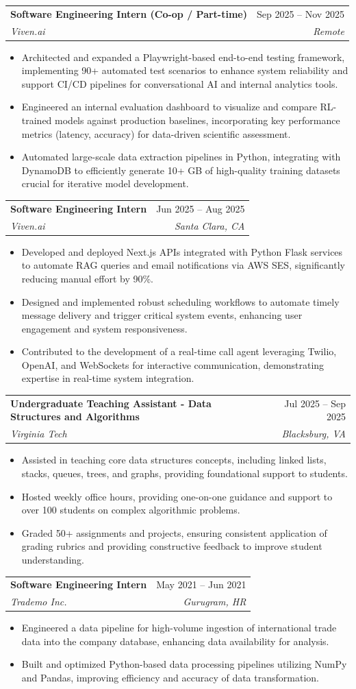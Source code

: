 \documentclass[letterpaper,11pt]{article}
\makeatletter
\newcommand{\resumeItem}[1]{
  \item\small{
    {#1 \vspace{-2pt}}
  }
}
\newcommand{\resumeSubheading}[4]{
  \vspace{-2pt}\item
    \begin{tabular*}{0.97\textwidth}[t]{l@{\extracolsep{\fill}}r}
      \textbf{#1} & #2 \\
      \textit{\small#3} & \textit{\small #4} \\
    \end{tabular*}\vspace{-7pt}
}
\newcommand{\resumeItemListStart}{\begin{itemize}}
\newcommand{\resumeItemListEnd}{\end{itemize}\vspace{-5pt}}
\makeatother
\begin{document}
    \resumeSubheading
      {Software Engineering Intern (Co-op / Part-time)}{Sep 2025 -- Nov 2025}
      {Viven.ai}{Remote}
      \resumeItemListStart
        \resumeItem{Architected and expanded a Playwright-based end-to-end testing framework, implementing 90+ automated test scenarios to enhance system reliability and support CI/CD pipelines for conversational AI and internal analytics tools.}
        \resumeItem{Engineered an internal evaluation dashboard to visualize and compare RL-trained models against production baselines, incorporating key performance metrics (latency, accuracy) for data-driven scientific assessment.}
        \resumeItem{Automated large-scale data extraction pipelines in Python, integrating with DynamoDB to efficiently generate 10+ GB of high-quality training datasets crucial for iterative model development.}
      \resumeItemListEnd

       \resumeSubheading
      {Software Engineering Intern}{Jun 2025 -- Aug 2025}
      {Viven.ai}{Santa Clara, CA}
      \resumeItemListStart
        \resumeItem{Developed and deployed Next.js APIs integrated with Python Flask services to automate RAG queries and email notifications via AWS SES, significantly reducing manual effort by 90\%.}
        \resumeItem{Designed and implemented robust scheduling workflows to automate timely message delivery and trigger critical system events, enhancing user engagement and system responsiveness.}
        \resumeItem{Contributed to the development of a real-time call agent leveraging Twilio, OpenAI, and WebSockets for interactive communication, demonstrating expertise in real-time system integration.}
      \resumeItemListEnd

    

    \resumeSubheading
      {Undergraduate Teaching Assistant - Data Structures and Algorithms}{Jul 2025 -- Sep 2025}
      {Virginia Tech}{Blacksburg, VA}
      \resumeItemListStart
        \resumeItem{Assisted in teaching core data structures concepts, including linked lists, stacks, queues, trees, and graphs, providing foundational support to students.}
        \resumeItem{Hosted weekly office hours, providing one-on-one guidance and support to over 100 students on complex algorithmic problems.}
        \resumeItem{Graded 50+ assignments and projects, ensuring consistent application of grading rubrics and providing constructive feedback to improve student understanding.}
      \resumeItemListEnd

    \resumeSubheading
      {Software Engineering Intern}{May 2021 -- Jun 2021}
      {Trademo Inc.}{Gurugram, HR}
      \resumeItemListStart
        \resumeItem{Engineered a data pipeline for high-volume ingestion of international trade data into the company database, enhancing data availability for analysis.}
        \resumeItem{Built and optimized Python-based data processing pipelines utilizing NumPy and Pandas, improving efficiency and accuracy of data transformation.}
      \resumeItemListEnd
\end{document}

